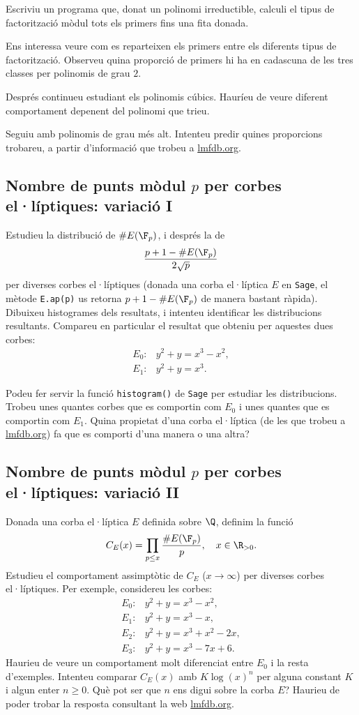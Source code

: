  Escriviu un programa que, donat un polinomi irreductible, calculi el tipus de factorització mòdul tots els primers fins una fita donada.
 
 Ens interessa veure com es reparteixen els primers entre els diferents tipus de factorització. Observeu quina proporció de primers hi ha en cadascuna de les tres classes per polinomis de grau $2$.
 
 Després continueu estudiant els polinomis cúbics. Hauríeu de veure diferent comportament depenent del polinomi que trieu.
 
 Seguiu amb polinomis de grau més alt. Intenteu predir quines proporcions trobareu, a partir d'informació que trobeu a \url{lmfdb.org}.
 

 \subsection{Nombre de punts mòdul \texorpdfstring{$p$}{p} per corbes el·líptiques: variació I}
 Estudieu la distribució de $\#E(\F_p)$, i després la de
 \[
 \frac{p+1 - \#E(\F_p)}{2\sqrt{p}}
 \]
 per diverses corbes el·líptiques (donada una corba el·líptica $E$ en \texttt{Sage}, el mètode \texttt{E.ap(p)} us retorna $p+1-\#E(\F_p)$ de manera bastant ràpida). Dibuixeu histogrames dels resultats, i intenteu identificar les distribucions resultants. Compareu en particular el resultat que obteniu per aquestes dues corbes:
 \begin{align*}
     E_0\colon & y^2 + y = x^3 - x^2,\\
     E_1\colon & y^2 + y = x^3.
 \end{align*}

 Podeu fer servir la funció \texttt{histogram()} de \texttt{Sage} per estudiar les distribucions. Trobeu unes quantes corbes que es comportin com $E_0$ i unes quantes que es comportin com $E_1$. Quina propietat d'una corba el·líptica (de les que trobeu a \url{lmfdb.org}) fa que es comporti d'una manera o una altra?
 
 \subsection{Nombre de punts mòdul \texorpdfstring{$p$}{p} per corbes el·líptiques: variació II}
 Donada una corba el·líptica $E$ definida sobre $\Q$, definim la funció
 \[
 C_E(x) = \prod_{p\leq x}\frac{\#E(\F_p)}{p},\quad x\in\R_{>0}.
 \]
 Estudieu el comportament assimptòtic de $C_E$ ($x\to\infty$) per diverses corbes el·líptiques. Per exemple, considereu les corbes:
 \begin{align*}
E_0\colon& y^2+y=x^3-x^2,\\
E_1\colon& y^2+y=x^3-x,\\
E_2\colon& y^2+y = x^3+x^2-2x,\\
E_3\colon&y^2 +y =x^3 - 7x+6.

\end{align*}
Haurieu de veure un comportament molt diferenciat entre $E_0$ i la resta d'exemples. Intenteu comparar $C_E(x)$ amb $K\log(x)^n$ per alguna constant $K$ i algun enter $n\geq 0$. Què pot ser que $n$ ens digui sobre la corba $E$? Haurieu de poder trobar la resposta consultant la web \url{lmfdb.org}.

